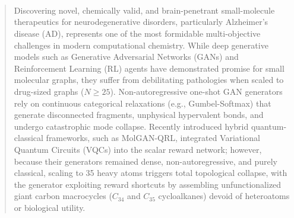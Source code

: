\documentclass[10pt,a4paper]{article}
\begin{document}
\\[0.45cm]

\\[0.25cm]

\\[0.35cm]

\begin{abstract}
\noindent Discovering novel, chemically valid, and brain-penetrant small-molecule therapeutics for neurodegenerative disorders, particularly Alzheimer's disease (AD), represents one of the most formidable multi-objective challenges in modern computational chemistry. While deep generative models such as Generative Adversarial Networks (GANs) and Reinforcement Learning (RL) agents have demonstrated promise for small molecular graphs, they suffer from debilitating pathologies when scaled to drug-sized graphs ($N \ge 25$). Non-autoregressive one-shot GAN generators rely on continuous categorical relaxations (e.g., Gumbel-Softmax) that generate disconnected fragments, unphysical hypervalent bonds, and undergo catastrophic mode collapse. Recently introduced hybrid quantum-classical frameworks, such as MolGAN-QRL, integrated Variational Quantum Circuits (VQCs) into the scalar reward network; however, because their generators remained dense, non-autoregressive, and purely classical, scaling to 35 heavy atoms triggers total topological collapse, with the generator exploiting reward shortcuts by assembling unfunctionalized giant carbon macrocycles ($C_{34}$ and $C_{35}$ cycloalkanes) devoid of heteroatoms or biological utility.


\end{abstract}
\end{document}
